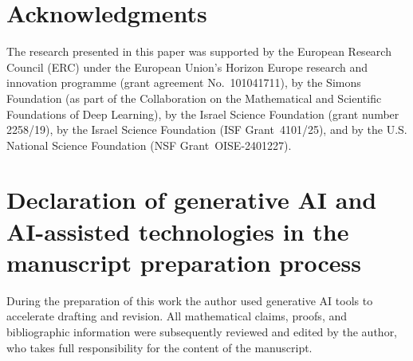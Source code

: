 \documentclass[11pt]{article}
\numberwithin{equation}{section}
\theoremstyle{definition}
\theoremstyle{remark}
\begin{document}
\section*{Acknowledgments}
The research presented in this paper was supported by the European Research Council (ERC) under the European Union's Horizon Europe research and innovation programme (grant agreement No.~101041711), by the Simons Foundation (as part of the Collaboration on the Mathematical and Scientific Foundations of Deep Learning), by the Israel Science Foundation (grant number 2258/19), by the Israel Science Foundation (ISF Grant~4101/25), and by the U.S. National Science Foundation (NSF Grant~OISE-2401227).

\section*{Declaration of generative AI and AI-assisted technologies in the manuscript preparation process}
During the preparation of this work the author used generative AI tools to accelerate drafting
and revision. All mathematical claims, proofs, and bibliographic information were subsequently
reviewed and edited by the author, who takes full responsibility for the content of the manuscript.

\FloatBarrier
\end{document}
